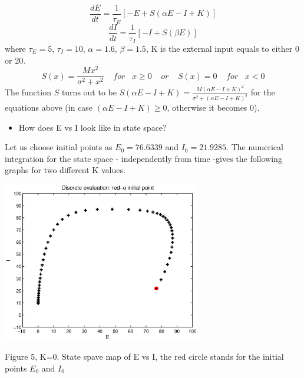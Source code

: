 \documentclass{article}
\begin{document}
\begin{equation}
 \frac{dE}{dt}=\frac{1}{\tau_E}[-E+S(\alpha E-I+K)]
\end{equation}
\begin{equation}
 \frac{dI}{dt}=\frac{1}{\tau_I}[-I+S(\beta E)]
\end{equation}
where $\tau_E=5$, $\tau_I=10$, $\alpha=1.6$, $\beta=1.5$, K is the external input equals to either 0 or 20. 
\begin{equation}
 S(x)=\frac{Mx^2}{\sigma^2+x^2} \;\;\;\;for\;\;\;x\geq0\;\;\;\;or\;\;\;\;S(x)=0\;\;\;\;for\;\;\;x<0
\end{equation}
The function $S$ turns out to be $S(\alpha E-I+K)=\frac{M(\alpha E-I+K)^2}{\sigma^2+(\alpha E-I+K)^2}$ for the equations above (in case $(\alpha E-I+K)\geq0$, otherwise it becomes 0).

\begin{itemize}
 \item How does E vs I look like in state space?
\end{itemize}

Let us choose initial points as $E_0=76.6339$ and $I_0=21.9285$. The numerical integration for the state space - independently from time -gives the following graphs for two different K values.
\begin{center}
 \includegraphics[width=\textwidth, height=7cm]{linear1.eps}
\begin{footnotesize}Figure 5, K=0. State spave map of E vs I, the red circle stands for the initial points $E_0$ and $I_0$\end{footnotesize}
\end{center}
\end{document}
